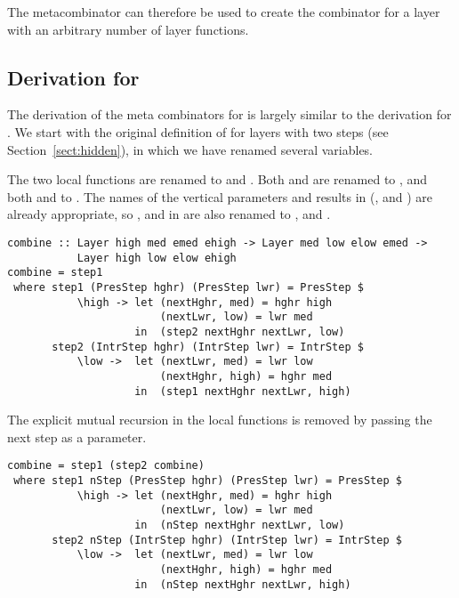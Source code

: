 The  metacombinator can therefore be used to create the  combinator for a layer with an arbitrary number of layer functions. \ec

%																
\subsection{Derivation for } \label{subsubsectcombine}


The derivation of the meta combinators for  is largely similar to the derivation for . We start with the original definition of  for layers with two steps (see Section~\ref{sect:hidden}), in which we have renamed several variables. 

\bc The two local functions are renamed to  and . Both  and  are renamed to , and both  and  to . The names of the vertical parameters and results in  (,  and ) are already appropriate, so ,  and  in  are also renamed to ,  and . \ec

\begin{small} %
\begin{verbatim}
combine :: Layer high med emed ehigh -> Layer med low elow emed -> 
           Layer high low elow ehigh
combine = step1
 where step1 (PresStep hghr) (PresStep lwr) = PresStep $
           \high -> let (nextHghr, med) = hghr high
                        (nextLwr, low) = lwr med
                    in  (step2 nextHghr nextLwr, low)
       step2 (IntrStep hghr) (IntrStep lwr) = IntrStep $
           \low ->  let (nextLwr, med) = lwr low
                        (nextHghr, high) = hghr med
                    in  (step1 nextHghr nextLwr, high)
\end{verbatim}
\end{small}

The explicit mutual recursion in the local functions is removed by passing the next step as a parameter.

\begin{small}
\begin{verbatim}
combine = step1 (step2 combine)
 where step1 nStep (PresStep hghr) (PresStep lwr) = PresStep $
           \high -> let (nextHghr, med) = hghr high
                        (nextLwr, low) = lwr med
                    in  (nStep nextHghr nextLwr, low)
       step2 nStep (IntrStep hghr) (IntrStep lwr) = IntrStep $
           \low ->  let (nextLwr, med) = lwr low
                        (nextHghr, high) = hghr med
                    in  (nStep nextHghr nextLwr, high)
\end{verbatim}
\end{small}


